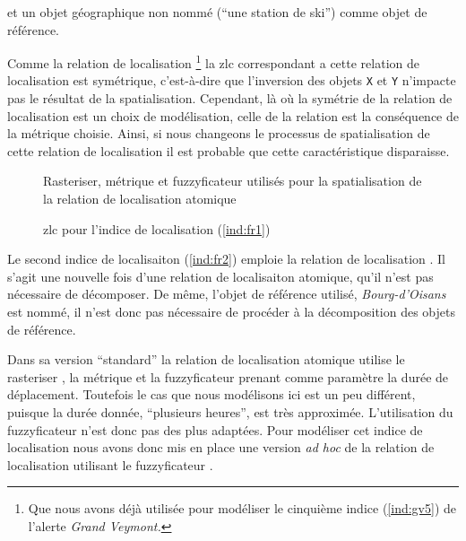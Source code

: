 et un objet
géographique non nommé (\enquote{une station de ski}) comme objet de
référence.

Comme
la relation de localisation  \footnote{Que
  nous avons déjà utilisée pour modéliser le cinquième indice
  (\ref{ind:gv5}) de l'alerte \emph{Grand Veymont.}} la \ac{zlc}
correspondant a cette relation de localisation est symétrique,
c'est-à-dire que l'inversion des objets \texttt{X} et \texttt{Y}
n'impacte pas le résultat de la spatialisation. Cependant, là où la
symétrie de la relation de localisation 
est un choix de modélisation, celle de la relation
 est la conséquence
de la métrique choisie. Ainsi, si nous changeons le processus de
spatialisation de cette relation de localisation il est probable que
cette caractéristique disparaisse.



\begin{figure}
  \centering
  
  \caption{Rasteriser, métrique et fuzzyficateur utilisés pour la
    spatialisation de la relation de localisation atomique
    \protect{}}
  \label{fig:ex_parties_statialisation_DanslaDirectionDe}
\end{figure}


\begin{figure}
  \centering
  
  \caption{\ac{zlc} pour l'indice de localisation  (\ref{ind:fr1})}
  \label{fig:ZLC_FilRouge_1}
\end{figure}



Le second indice de localisaiton (\ref{ind:fr2}) emploie la relation
de localisation . Il s'agit une
nouvelle fois d'une relation de localisaiton atomique, qu'il n'est pas
nécessaire de décomposer. De même, l'objet de référence utilisé,
\emph{Bourg-d'Oisans} est nommé, il n'est donc pas nécessaire de
procéder à la décomposition des objets de référence.

Dans sa version \enquote{standard} la relation de localisation
atomique  utilise le rasteriser
, la métrique \onto[orla]{} et la fuzzyficateur
 prenant comme paramètre la durée de
déplacement. Toutefois le cas que nous modélisons ici est un peu
différent, puisque la durée donnée, \enquote{plusieurs heures}, est
très approximée.
%
L'utilisation du fuzzyficateur 
n'est donc pas des plus adaptées.
%
Pour modéliser cet indice de localisation nous avons donc mis en place
une version \emph{ad hoc} de la relation de localisation
 utilisant le fuzzyficateur
.

